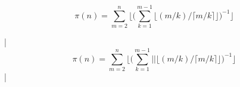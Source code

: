 

\bigskip


$$\pi(n) = \sum^n_{m = 2} \Bigg\lfloor \bigg( \sum^{m - 1}_{k = 1}
\big\lfloor (m / k) \big/ \lceil m / k \rceil \big\rfloor \bigg)^{-1} \Bigg\rfloor$$

\bigskip

\respuestaS

|$$\pi(n) = \sum^n_{m = 2} \Bigg\lfloor \bigg( \sum^{m - 1}_{k = 1}|

|\big\lfloor (m / k) \big/ \lceil m / k \rceil \big\rfloor \bigg)^{-1} \Bigg\rfloor$$|

\bye

